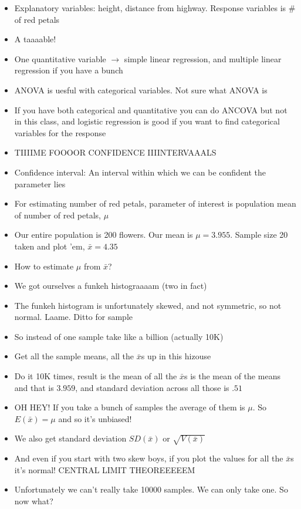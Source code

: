 \documentclass{article}
\begin{document}
\begin{itemize}
    \item Explanatory variables: height, distance from highway. Response variables is \# of red petals
    \item A taaaable!
    \item One quantitative variable $ \rightarrow $ simple linear regression, and multiple linear regression if you have a bunch
    \item ANOVA is uesful with categorical variables. Not sure what ANOVA is 
    \item If you have both categorical and quantitative you can do ANCOVA but not in this class, and logistic regression is good if you want to find categorical variables for the response
    \item TIIIIME FOOOOR CONFIDENCE IIIINTERVAAALS
    \item Confidence interval: An interval within which we can be confident the parameter lies
    \item For estimating number of red petals, parameter of interest is population mean of number of red petals, $ \mu $
    \item Our entire population is 200 flowers. Our mean is $ \mu = 3.955 $. Sample size 20 taken and plot 'em,  $  \bar{x} = 4.35 $
    \item How to estimate $ \mu $ from  $  \bar{x} $?
    \item We got ourselves a funkeh histograaaam (two in fact)
    \item The funkeh histogram is unfortunately skewed, and not symmetric, so not normal. Laame. Ditto for sample
    \item So instead of one sample take like a billion (actually 10K)
    \item Get all the sample means, all the $ \bar{x} $s up in this hizouse
    \item Do it 10K times, result is the mean of all the $ \bar{x} $s is the mean of the means and that is $ 3.959 $, and standard deviation across all those is $ .51 $
    \item OH HEY! If you take a bunch of samples the average of them is $ \mu $. So  $ E( \bar{x}) = \mu $ and so it's unbiased!
    \item We also get standard deviation $ SD( \bar{x}) $ or $ \sqrt{ V( \bar{x}) } $
    \item And even if you start with two skew boys, if you plot the values for all the $ \bar{x} $s it's normal! CENTRAL LIMIT THEOREEEEEM
    \item Unfortunately we can't really take 10000 samples. We can only take one. So now what?

\end{itemize}
\end{document}
